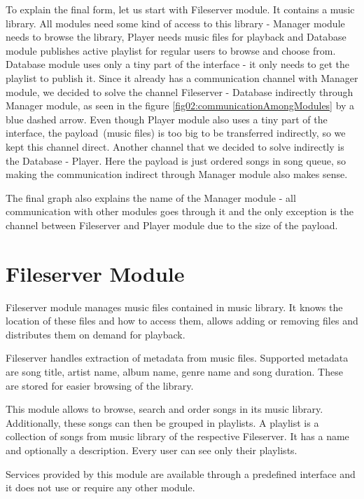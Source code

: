 \par
To explain the final form, let us start with Fileserver module. It contains a music library. All modules need some kind of access to this library - Manager module needs to browse the library, Player needs music files for playback and Database module publishes active playlist for regular users to browse and choose from. Database module uses only a tiny part of the interface - it only needs to get the playlist to publish it. Since it already has a communication channel with Manager module, we decided to solve the channel Fileserver - Database indirectly through Manager module, as seen in the figure \ref{fig02:communicationAmongModules} by a blue dashed arrow. Even though Player module also uses a tiny part of the interface, the payload~(music files) is too big to be transferred indirectly, so we kept this channel direct. Another channel that we decided to solve indirectly is the Database - Player. Here the payload is just ordered songs in song queue, so making the communication indirect through Manager module also makes sense.
\par
The final graph also explains the name of the Manager module - all communication with other modules goes through it and the only exception is the channel between Fileserver and Player module due to the size of the payload.

\section{Fileserver Module}

Fileserver module manages music files contained in music library. It knows the location of these files and how to access them, allows adding or removing files and distributes them on demand for playback.
\par
Fileserver handles extraction of metadata from music files. Supported metadata are song title, artist name, album name, genre name and song duration. These are stored for easier browsing of the library.
\par
This module allows to browse, search and order songs in its music library. Additionally, these songs can then be grouped in playlists. A playlist is a collection of songs from music library of the respective Fileserver. It has a name and optionally a description. Every user can see only their playlists.
\par
Services provided by this module are available through a predefined interface and it does not use or require any other module.

